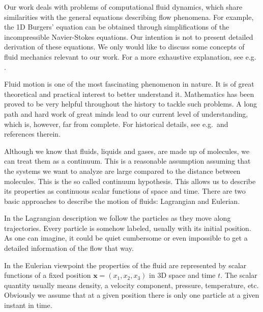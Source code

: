 \documentclass[../include.tex]{subfiles}
\begin{document}
Our work deals with problems of computational fluid dynamics, which share similarities with the general equations describing flow phenomena. For example, the 1D Burgers' equation can be obtained through simplifications of the incompressible Navier-Stokes equations. Our intention is not to present detailed derivation of these equations. We only would like to discuss some concepts of fluid mechanics relevant to our work. For a more exhaustive explanation, see e.g.\, \cite{batchelor, cengel, kundu, feist, frolk, white}.

Fluid motion is one of the most fascinating phenomenon in nature. It is of great theoretical and practical interest to better understand it. Mathematics has been proved to be very helpful throughout the history to tackle such problems. A long path and hard work of great minds lead to our current level of understanding, which is, however, far from complete. For historical details, see e.g.\, \cite{cengel, white} and references therein.

Although we know that fluids, liquids and gases, are made up of molecules, we can treat them as a continuum. This is a reasonable assumption assuming that the systems we want to analyze are large compared to the distance between molecules. This is the so called continuum hypothesis. This allows us to describe its properties as continuous scalar functions of space and time.
There are two basic approaches to describe the motion of fluids: Lagrangian and Eulerian. 

In the Lagrangian description we follow the particles as they move along trajectories. Every particle is somehow labeled, usually with its initial position. As one can imagine, it could be quiet cumbersome or even impossible to get a detailed information of the flow that way.

In the Eulerian viewpoint the properties of the fluid are represented by scalar functions of a fixed position $ \mathbf{x} = (x_1, x_2, x_3) $ in 3D space and time $ t $. The scalar quantity usually means density, a velocity component, pressure, temperature, etc. Obviously we assume that at a given position there is only one particle at a given instant in time.
\end{document}
